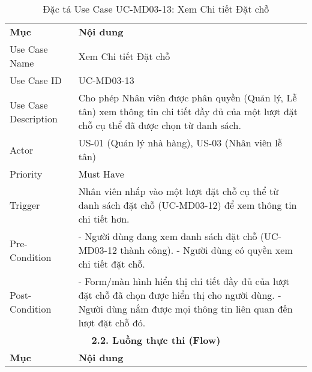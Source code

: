 \begin{longtable}{|m{4cm}|p{11cm}|}
\caption{Đặc tả Use Case UC-MD03-13: Xem Chi tiết Đặt chỗ} \label{tab:uc_md03_13} \\
\hline

\endhead %
\hline
\endfoot %
\hline
\endlastfoot %
\multicolumn{2}{|c|}{\textbf{2.1. Tóm tắt (Summary)}} \\
\hline
\textbf{Mục} & \textbf{Nội dung} \\
\hline
Use Case Name & Xem Chi tiết Đặt chỗ \\
\hline
Use Case ID & UC-MD03-13 \\
\hline
Use Case Description & Cho phép Nhân viên được phân quyền (Quản lý, Lễ tân) xem thông tin chi tiết đầy đủ của một lượt đặt chỗ cụ thể đã được chọn từ danh sách. \\
\hline
Actor & US-01 (Quản lý nhà hàng), US-03 (Nhân viên lễ tân) \\
\hline
Priority & Must Have \\
\hline
Trigger & Nhân viên nhấp vào một lượt đặt chỗ cụ thể từ danh sách đặt chỗ (UC-MD03-12) để xem thông tin chi tiết hơn. \\
\hline
Pre-Condition & - Người dùng đang xem danh sách đặt chỗ (UC-MD03-12 thành công). \newline - Người dùng có quyền xem chi tiết đặt chỗ. \\
\hline
Post-Condition & - Form/màn hình hiển thị chi tiết đầy đủ của lượt đặt chỗ đã chọn được hiển thị cho người dùng. \newline - Người dùng nắm được mọi thông tin liên quan đến lượt đặt chỗ đó. \\
\hline
\multicolumn{2}{|c|}{\textbf{2.2. Luồng thực thi (Flow)}} \\
\hline
\textbf{Mục} & \textbf{Nội dung} \\
\hline

\end{longtable}
